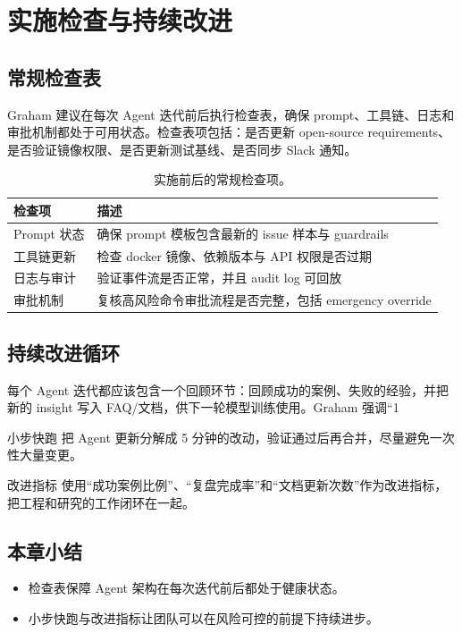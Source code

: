 \section{实施检查与持续改进}
\subsection{常规检查表}
Graham 建议在每次 Agent 迭代前后执行检查表，确保 prompt、工具链、日志和审批机制都处于可用状态。检查表项包括：是否更新 open-source requirements、是否验证镜像权限、是否更新测试基线、是否同步 Slack 通知。

\begin{table}[H]
\centering
\begin{tabular}{p{} p{}}
\toprule
检查项 & 描述 \\
\midrule
Prompt 状态 & 确保 prompt 模板包含最新的 issue 样本与 guardrails \\
\midrule
工具链更新 & 检查 docker 镜像、依赖版本与 API 权限是否过期 \\
\midrule
日志与审计 & 验证事件流是否正常，并且 audit log 可回放 \\
\midrule
审批机制 & 复核高风险命令审批流程是否完整，包括 emergency override \\
\bottomrule
\end{tabular}
\caption{实施前后的常规检查项。}
\end{table}

\subsection{持续改进循环}
每个 Agent 迭代都应该包含一个回顾环节：回顾成功的案例、失败的经验，并把新的 insight 写入 FAQ/文档，供下一轮模型训练使用。Graham 强调“1%

\begin{importantbox}{小步快跑}
把 Agent 更新分解成 5 分钟的改动，验证通过后再合并，尽量避免一次性大量变更。
\end{importantbox}

\begin{knowledgebox}{改进指标}
使用“成功案例比例”、“复盘完成率”和“文档更新次数”作为改进指标，把工程和研究的工作闭环在一起。
\end{knowledgebox}

\subsection{本章小结}
\begin{itemize}
    \item 检查表保障 Agent 架构在每次迭代前后都处于健康状态。
    \item 小步快跑与改进指标让团队可以在风险可控的前提下持续进步。
\end{itemize}

